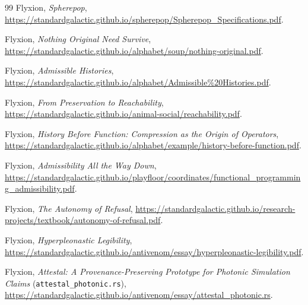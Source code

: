\documentclass[11pt]{article}
\begin{document}
\begin{thebibliography}{99}
 Flyxion, \textit{Spherepop}, \url{https://standardgalactic.github.io/spherepop/Spherepop_Specifications.pdf}.

 Flyxion, \textit{Nothing Original Need Survive}, \url{https://standardgalactic.github.io/alphabet/soup/nothing-original.pdf}.

 Flyxion, \textit{Admissible Histories}, \url{https://standardgalactic.github.io/alphabet/Admissible\%20Histories.pdf}.

 Flyxion, \textit{From Preservation to Reachability}, \url{https://standardgalactic.github.io/animal-social/reachability.pdf}.

 Flyxion, \textit{History Before Function: Compression as the Origin of Operators}, \url{https://standardgalactic.github.io/alphabet/example/history-before-function.pdf}.

 Flyxion, \textit{Admissibility All the Way Down}, \url{https://standardgalactic.github.io/playfloor/coordinates/functional_programming_admissibility.pdf}.

 Flyxion, \textit{The Autonomy of Refusal}, \url{https://standardgalactic.github.io/research-projects/textbook/autonomy-of-refusal.pdf}.

 Flyxion, \textit{Hyperpleonastic Legibility}, \url{https://standardgalactic.github.io/antivenom/essay/hyperpleonastic-legibility.pdf}.

 Flyxion, \textit{Attestal: A Provenance-Preserving Prototype for Photonic Simulation Claims} (\texttt{attestal\_photonic.rs}), \url{https://standardgalactic.github.io/antivenom/essay/attestal_photonic.rs}.

\end{thebibliography}
\end{document}
